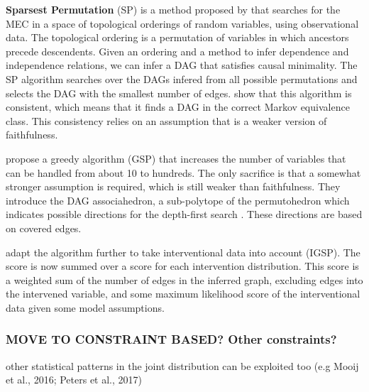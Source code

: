 \textbf{Sparsest Permutation} (SP) is a method proposed by \citet{raskutti2018learning} that searches for the MEC in a space of topological orderings of random variables, using observational data. The topological ordering is a permutation of variables in which ancestors precede descendents. Given an ordering and a method to infer dependence and independence relations, we can infer a DAG that satisfies causal minimality. The SP algorithm searches over the DAGs infered from all possible permutations and selects the DAG with the smallest number of edges. \citet{raskutti2018learning} show that this algorithm is consistent, which means that it finds a DAG in the correct Markov equivalence class. This consistency relies on an assumption that is a weaker version of faithfulness. 

\citet{solus2017consistency} propose a greedy algorithm (GSP) that increases the number of variables that can be handled from about 10 to hundreds. The only sacrifice is that a somewhat stronger assumption is required, which is still weaker than faithfulness. They introduce the DAG associahedron, a sub-polytope of the permutohedron which indicates possible directions for the depth-first search . These directions are based on covered edges. 

\citet{wang2017permutation} adapt the algorithm further to take interventional data into account (IGSP). The score is now summed over a score for each intervention distribution. This score is a weighted sum of the number of edges in the inferred graph, excluding edges into the intervened variable, and some maximum likelihood score of the interventional data given some model assumptions.





\subsubsection{MOVE TO CONSTRAINT BASED? Other constraints?}
other statistical patterns in the joint distribution can be exploited too (e.g Mooij et al., 2016; Peters et al., 2017)


